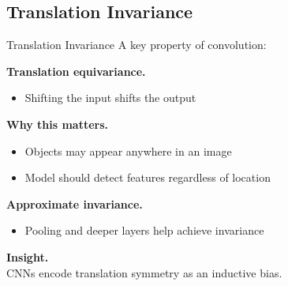 \documentclass[aspectratio=169,11pt]{beamer}
\begin{document}
\subsection{Translation Invariance}
\begin{frame}[t,allowframebreaks]{Translation Invariance}
\small
A key property of convolution:

\textbf{Translation equivariance.}\\ \begin{itemize}
    \item Shifting the input shifts the output
\end{itemize}

\textbf{Why this matters.}\\ \begin{itemize}
    \item Objects may appear anywhere in an image
    \item Model should detect features regardless of location
\end{itemize}

\textbf{Approximate invariance.}\\ \begin{itemize}
    \item Pooling and deeper layers help achieve invariance
\end{itemize}

\textbf{Insight.}\\ CNNs encode translation symmetry as an inductive bias.
\end{frame}
\end{document}

